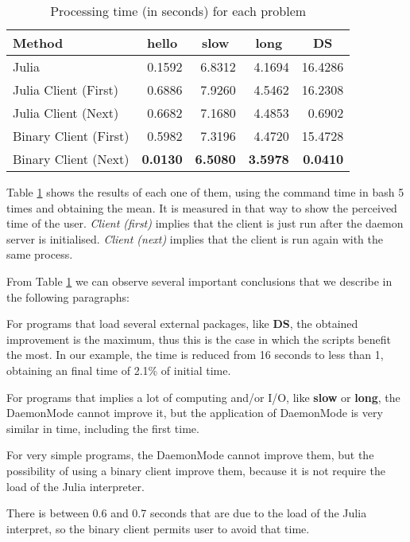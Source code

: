\documentclass{juliacon}
\begin{document}
\begin{table}[htp]
  \centering
  \begin{tabular}{l*{4}{r}}
    \toprule
    Method & \multicolumn{1}{c}{\textbf{hello}} & \multicolumn{1}{c}{\textbf{slow}} & \multicolumn{1}{c}{\textbf{long}} & \multicolumn{1}{c}{\textbf{DS}}\\
    \midrule
    Julia & 0.1592 & 6.8312 &  4.1694 & 16.4286\\
    Julia Client (First) & 0.6886 & 7.9260 & 4.5462 & 16.2308\\
    Julia Client (Next) & 0.6682 & 7.1680 & 4.4853  & 0.6902\\
    Binary Client (First) & 0.5982 & 7.3196 & 4.4720 & 15.4728\\
    Binary Client (Next) & \textbf{0.0130} & \textbf{6.5080} & \textbf{3.5978} & \textbf{0.0410}\\
    \bottomrule
  \end{tabular}
  \caption{Processing time (in seconds) for each problem}
  \label{tab:times}
\end{table}

Table \ref{tab:times} shows the results of each one of them, using the command
time in bash 5 times and obtaining the mean. It is measured in that way to show
the perceived time of the user. \textit{Client (first)} implies that the client is just
run after the daemon server is initialised. \textit{Client (next)} implies that
the client is run again with the same process.

From Table \ref{tab:times} we can observe several important conclusions that we
describe in the following paragraphs:

For programs that load several external packages, like \textbf{DS}, the obtained
improvement is the maximum, thus this is the case in which the scripts benefit
the most. In our example, the time is reduced from 16 seconds to less than 1,
obtaining an final time of 2.1\% of initial time.
  
For programs that implies a lot of computing and/or I/O, like \textbf{slow} or
\textbf{long}, the DaemonMode cannot improve it, but the application of
DaemonMode is very similar in time, including the first time. 
 
For very simple programs, the DaemonMode cannot improve them, but the
possibility of using a binary client improve them, because it is not require the
load of the Julia interpreter.

There is between 0.6 and 0.7 seconds that are due to the load of the Julia
interpret, so the binary client permits user to avoid that time. 
\end{document}
